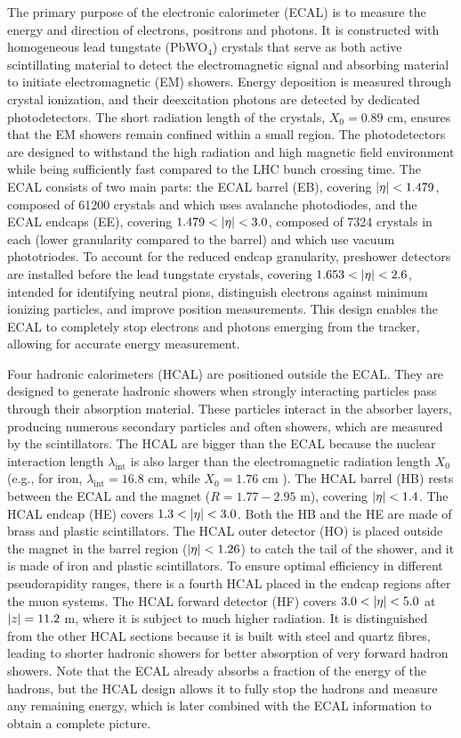 The primary purpose of the electronic calorimeter (ECAL) is to measure the energy and direction of electrons, positrons and photons. It is constructed with homogeneous lead tungstate (PbWO$_4$) crystals that serve as both active scintillating material to detect the electromagnetic signal and absorbing material to initiate electromagnetic (EM) showers. Energy deposition is measured through crystal ionization, and their deexcitation photons are detected by dedicated photodetectors. The short radiation length of the crystals, $X_0 = 0.89$ cm, ensures that the EM showers remain confined within a small region. The photodetectors are designed to withstand the high radiation and high magnetic field environment while being sufficiently fast compared to the LHC bunch crossing time. The ECAL consists of two main parts: the ECAL barrel (EB), covering $\left\lvert\eta\right\rvert < 1.479$, composed of 61200 crystals and which uses avalanche photodiodes, and the ECAL endcaps (EE), covering $1.479 < \left\lvert\eta\right\rvert < 3.0$, composed of 7324 crystals in each (lower granularity compared to the barrel) and which use vacuum phototriodes. To account for the reduced endcap granularity, preshower detectors are installed before the lead tungstate crystals, covering $1.653 < \left\lvert\eta\right\rvert < 2.6$, intended for identifying neutral pions, distinguish electrons against minimum ionizing particles, and improve position measurements. This design enables the ECAL to completely stop electrons and photons emerging from the tracker, allowing for accurate energy measurement.

Four hadronic calorimeters (HCAL) are positioned outside the ECAL. They are designed to generate hadronic showers when strongly interacting particles pass through their absorption material. These particles interact in the absorber layers, producing numerous secondary particles and often showers, which are measured by the scintillators. The HCAL are bigger than the ECAL because the nuclear interaction length $\lambda_\text{int}$ is also larger than the electromagnetic radiation length $X_0$ (e.g., for iron, $\lambda_\text{int}=16.8$ cm, while $X_0=1.76$ cm \cite{Buckley:2021fcn}). The HCAL barrel (HB) rests between the ECAL and the magnet ($R=1.77-2.95$ m), covering $\left\lvert\eta\right\rvert < 1.4$. The HCAL endcap (HE) covers $1.3 < \left\lvert\eta\right\rvert < 3.0$. Both the HB and the HE are made of brass and plastic scintillators. The HCAL outer detector (HO) is placed outside the magnet in the barrel region ($\left\lvert\eta\right\rvert < 1.26$) to catch the tail of the shower, and it is made of iron and plastic scintillators. To ensure optimal efficiency in different pseudorapidity ranges, there is a fourth HCAL placed in the endcap regions after the muon systems. The HCAL forward detector (HF) covers $3.0 < \left\lvert\eta\right\rvert < 5.0$ at $\left\lvert z\right\rvert = 11.2$ m, where it is subject to much higher radiation. It is distinguished from the other HCAL sections because it is built with steel and quartz fibres, leading to shorter hadronic showers for better absorption of very forward hadron showers. Note that the ECAL already absorbs a fraction of the energy of the hadrons, but the HCAL design allows it to fully stop the hadrons and measure any remaining energy, which is later combined with the ECAL information to obtain a complete picture.

